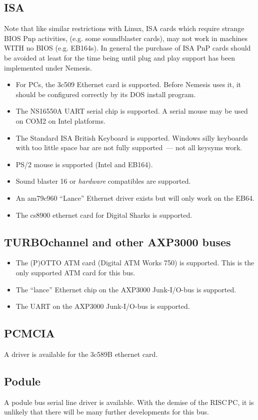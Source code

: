 \subsection{ISA}

Note that like similar restrictions with Linux, ISA cards which
require strange BIOS Pnp activities, (e.g. some soundblaster cards),
may not work in machines WITH no BIOS (e.g. EB164s).  In general the
purchase of ISA PnP cards should be avoided at least for the time
being until plug and play support has been implemented under Nemesis.

\begin{itemize}
\item For PCs, the 3c509 Ethernet card is supported.  Before Nemesis
  uses it, it should be configured correctly by its DOS install
  program.
\item The NS16550A UART serial chip is supported.  A serial mouse may
  be used on COM2 on Intel platforms.
\item The Standard ISA British Keyboard is supported.  Windows silly
  keyboards with too little space bar are not fully supported~--- not
  all keysyms work.
\item PS/2 mouse is supported (Intel and EB164).
\item Sound blaster 16 or \emph{hardware} compatibles are supported.
\item An am79c960 ``Lance'' Ethernet driver exists but will only work
  on the EB64.
\item The cs8900 ethernet card for Digital Sharks is supported.
\end{itemize}

\subsection{TURBOchannel and other AXP3000 buses}
\begin{itemize}
\item The (P)OTTO ATM card (Digital ATM Works 750) is supported.  This
  is the only supported ATM card for this bus.
\item The ``lance'' Ethernet chip on the AXP3000 Junk-I/O-bus is
  supported.
\item The UART on the AXP3000 Junk-I/O-bus is supported.
\end{itemize}

\subsection{PCMCIA}

A driver is available for the 3c589B ethernet card.

\subsection{Podule}

A podule bus serial line driver is available.  With the demise of the
RISC\,PC, it is unlikely that there will be many further developments
for this bus.
